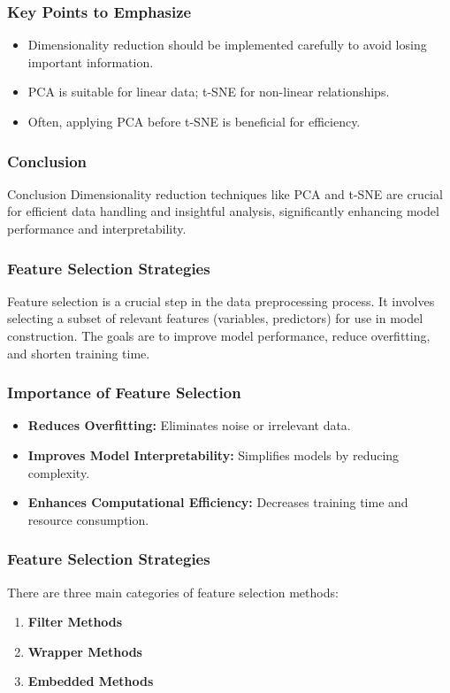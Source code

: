 \documentclass[aspectratio=169]{beamer}
\begin{document}
\begin{frame}[fragile]
    \frametitle{Key Points to Emphasize}
    \begin{itemize}
        \item Dimensionality reduction should be implemented carefully to avoid losing important information.
        \item PCA is suitable for linear data; t-SNE for non-linear relationships.
        \item Often, applying PCA before t-SNE is beneficial for efficiency.
    \end{itemize}
\end{frame}

\begin{frame}[fragile]
    \frametitle{Conclusion}
    \begin{block}{Conclusion}
        Dimensionality reduction techniques like PCA and t-SNE are crucial for efficient data handling and insightful analysis, significantly enhancing model performance and interpretability.
    \end{block}
\end{frame}

\begin{frame}
    \frametitle{Feature Selection Strategies}
    Feature selection is a crucial step in the data preprocessing process. It involves selecting a subset of relevant features (variables, predictors) for use in model construction. The goals are to improve model performance, reduce overfitting, and shorten training time.
\end{frame}

\begin{frame}
    \frametitle{Importance of Feature Selection}
    \begin{itemize}
        \item \textbf{Reduces Overfitting:} Eliminates noise or irrelevant data.
        \item \textbf{Improves Model Interpretability:} Simplifies models by reducing complexity.
        \item \textbf{Enhances Computational Efficiency:} Decreases training time and resource consumption.
    \end{itemize}
\end{frame}

\begin{frame}
    \frametitle{Feature Selection Strategies}
    There are three main categories of feature selection methods:
    \begin{enumerate}
        \item \textbf{Filter Methods}
        \item \textbf{Wrapper Methods}
        \item \textbf{Embedded Methods}
    \end{enumerate}
\end{frame}
\end{document}
